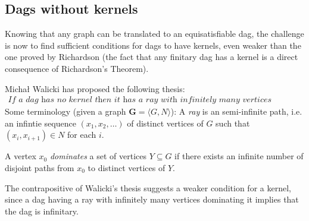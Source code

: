 
\subsection{Dags without kernels}
\label{sub:Dags without kernels}
Knowing that any graph can be translated to an equisatisfiable dag, the challenge is now to find sufficient conditions for dags to have kernels, even weaker than the one proved by Richardson (the fact that any finitary dag has a kernel is a direct consequence of Richardson's Theorem).

Michał Walicki has proposed the following thesis:
\begin{align}
  \textit{If a dag has no kernel then it has a ray with infinitely many vertices dominating it.}
\end{align}
Some terminology (given a graph $\mathbf{G} = \langle G,N \rangle$):
A \textit{ray} is an semi-infinite path, i.e. an infintie sequence $(x_1, x_2, \dots)$ of distinct vertices of $G$ such that $(x_i,x_{i+1}) \in N$ for each $i$.

A vertex $x_0$ \textit{dominates} a set of vertices $Y \subseteq G$ if there exists an infinite number of disjoint paths from $x_0$ to distinct vertices of $Y$.

The contrapositive of Walicki's thesis suggests a weaker condition for a kernel, since a dag having a ray with infinitely many vertices dominating it implies that the dag is infinitary.

